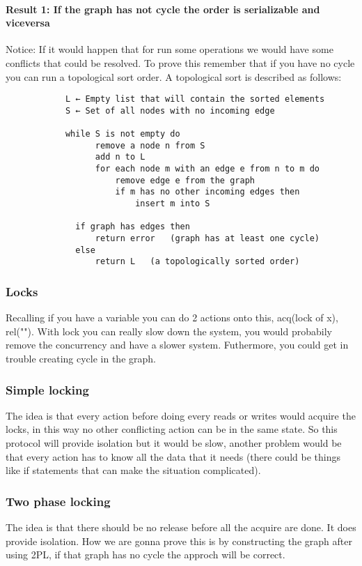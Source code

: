 \documentclass{article}
\begin{document}
        \paragraph{Result 1: If the graph has not cycle the order is serializable and viceversa}
          Notice: If it would happen that for run some operations we would have some conflicts
          that could be resolved. To prove this remember that if you have no cycle you
          can run a topological sort order. A topological sort is described as follows: 
          \begin{verbatim}
            L ← Empty list that will contain the sorted elements
            S ← Set of all nodes with no incoming edge

            while S is not empty do
                  remove a node n from S
                  add n to L
                  for each node m with an edge e from n to m do
                      remove edge e from the graph
                      if m has no other incoming edges then
                          insert m into S

              if graph has edges then
                  return error   (graph has at least one cycle)
              else 
                  return L   (a topologically sorted order)
            \end{verbatim}
       \subsubsection{Locks}
         Recalling if you have a variable you can do 2 actions onto this, acq(lock of x), rel("").
         With lock you can really slow down the system, you would probabily remove the concurrency
         and have a slower system. Futhermore, you could get in trouble creating cycle in the
         graph.
      \subsubsection{Simple locking}
        The idea is that every action before doing every reads or writes would acquire the locks,
        in this way no other conflicting action can be in the same state. So this protocol will
        provide isolation but it would be slow, another problem would be that every action 
        has to know all the data that it needs (there could be things like if statements that 
        can make the situation complicated).
      \subsubsection{Two phase locking}
        The idea is that there should be no release before all the acquire are done. It does
        provide isolation. How we are gonna prove this is by constructing the graph after 
        using 2PL, if that graph has no cycle the approch will be correct. 
\end{document}
